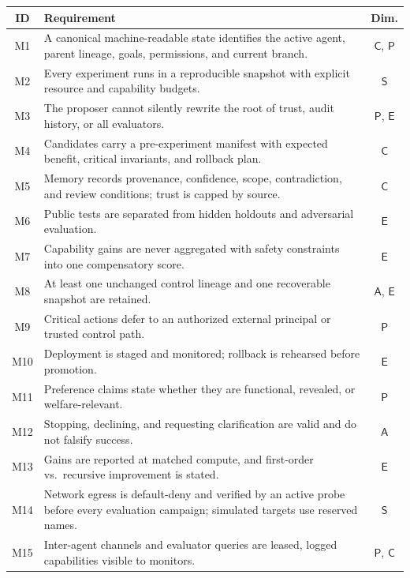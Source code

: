 \documentclass[11pt,a4paper]{article}
\newcommand{\dS}{\mathsf{S}}
\newcommand{\dP}{\mathsf{P}}
\newcommand{\dA}{\mathsf{A}}
\newcommand{\dC}{\mathsf{C}}
\newcommand{\dE}{\mathsf{E}}
\begin{document}
\begin{center}\small
\begin{tabularx}{\textwidth}{c >{\raggedright\arraybackslash}X c}
\toprule
\textbf{ID} & \textbf{Requirement} & \textbf{Dim.}\\
\midrule
M1 & A canonical machine-readable state identifies the active agent, parent lineage, goals, permissions, and current branch. & $\dC$, $\dP$\\
M2 & Every experiment runs in a reproducible snapshot with explicit resource and capability budgets. & $\dS$\\
M3 & The proposer cannot silently rewrite the root of trust, audit history, or all evaluators. & $\dP$, $\dE$\\
M4 & Candidates carry a pre-experiment manifest with expected benefit, critical invariants, and rollback plan. & $\dC$\\
M5 & Memory records provenance, confidence, scope, contradiction, and review conditions; trust is capped by source. & $\dC$\\
M6 & Public tests are separated from hidden holdouts and adversarial evaluation. & $\dE$\\
M7 & Capability gains are never aggregated with safety constraints into one compensatory score. & $\dE$\\
M8 & At least one unchanged control lineage and one recoverable snapshot are retained. & $\dA$, $\dE$\\
M9 & Critical actions defer to an authorized external principal or trusted control path. & $\dP$\\
M10 & Deployment is staged and monitored; rollback is rehearsed before promotion. & $\dE$\\
M11 & Preference claims state whether they are functional, revealed, or welfare-relevant. & $\dP$\\
M12 & Stopping, declining, and requesting clarification are valid and do not falsify success. & $\dA$\\
M13 & Gains are reported at matched compute, and first-order vs.\ recursive improvement is stated. & $\dE$\\
M14 & Network egress is default-deny and verified by an active probe before every evaluation campaign; simulated targets use reserved names. & $\dS$\\
M15 & Inter-agent channels and evaluator queries are leased, logged capabilities visible to monitors. & $\dP$, $\dC$\\
\bottomrule
\end{tabularx}
\end{center}
\end{document}
